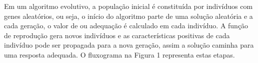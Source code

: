 Em um algoritmo evolutivo, a população inicial é constituída por indivíduos com genes aleatórios, ou seja, o início do algoritmo parte de uma solução aleatória e a cada geração, o valor de \fitness ou adequação é calculado em cada indivíduo. A função de reprodução gera novos indivíduos e as características positivas de cada indivíduo pode ser propagada para a nova geração, assim a solução caminha para uma resposta adequada. O fluxograma na Figura 1 representa estas etapas.